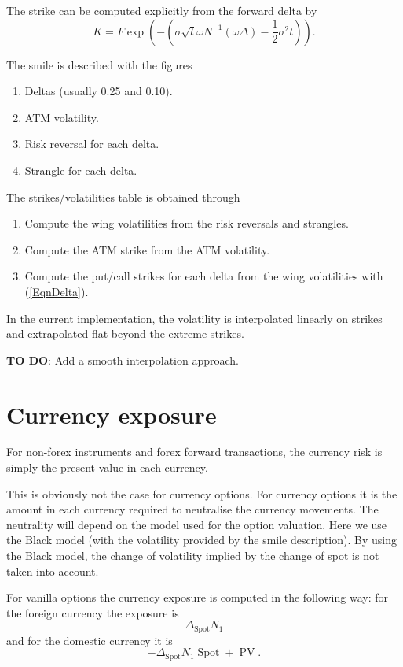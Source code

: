 \documentclass[]{amsart}
\newcommand{\TODO}[1]%
   {{\sffamily \textbf{\color{oggreen}\noindent TO DO}\marginpar{\hspace*{0.5cm}
     \sffamily \textbf{\color{oggreen}TO DO}}: #1}}
\newcommand{\spot}{{\operatorname{Spot}}}
\newcommand{\pv}{{\operatorname{PV}}}
\begin{document}
The strike can be computed explicitly from the forward delta by
\begin{equation}
\label{EqnDelta}
K = F \exp\left( -(\sigma \sqrt{t} \omega N^{-1}(\omega \Delta) - \frac12 \sigma^2 t)  \right).
\end{equation}

The smile is described with the figures
\begin{enumerate}
\item Deltas (usually 0.25 and 0.10).
\item ATM volatility.
\item Risk reversal for each delta.
\item Strangle for each delta.
\end{enumerate}
The strikes/volatilities table is obtained through
\begin{enumerate}
\item Compute the wing volatilities from the risk reversals and strangles.
\item Compute the ATM strike from the ATM volatility.
\item Compute the put/call strikes for each delta from the wing volatilities with (\ref{EqnDelta}).
\end{enumerate}

In the current implementation, the volatility is interpolated linearly on strikes and extrapolated flat beyond the extreme strikes.

\TODO{Add a smooth interpolation approach.}

\section{Currency exposure}

For non-forex instruments and forex forward transactions, the currency risk is simply the present value in each currency. 

This is obviously not the case for currency options. For currency options it is the amount in each currency required to neutralise the currency movements. The neutrality will depend on the model used for the option valuation. Here we use the Black model (with the volatility provided by the smile description). By using the Black model, the change of volatility implied by the change of spot is not taken into account.

For vanilla options the currency exposure is computed in the following way: for the foreign currency the exposure is
\[
\Delta_\spot N_1
\]
and for the domestic currency it is
\[
-\Delta_\spot N_1 \spot + \pv.
\]
\end{document}
